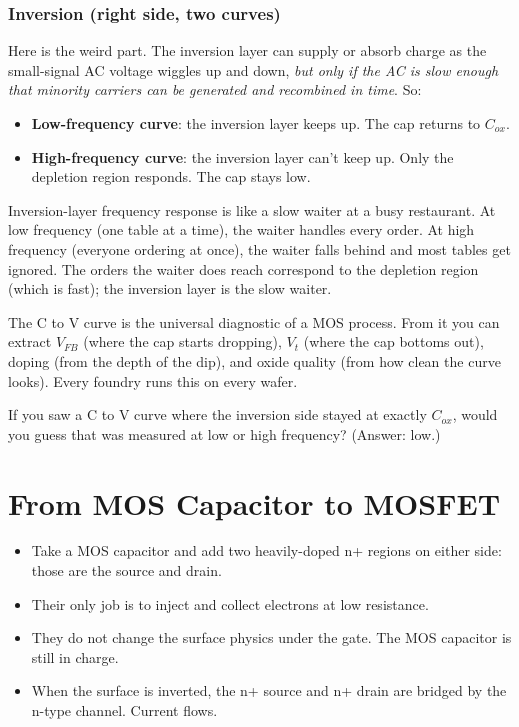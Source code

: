 \documentclass[11pt]{article}
\begin{document}
\subsubsection{Inversion (right side, two curves)}

Here is the weird part. The inversion layer can supply or absorb charge as the small-signal AC voltage wiggles up and down, \emph{but only if the AC is slow enough that minority carriers can be generated and recombined in time}. So:
\begin{itemize}
\item \textbf{Low-frequency curve}: the inversion layer keeps up. The cap returns to $C_{ox}$.
\item \textbf{High-frequency curve}: the inversion layer can't keep up. Only the depletion region responds. The cap stays low.
\end{itemize}

\begin{hook}
Inversion-layer frequency response is like a slow waiter at a busy restaurant. At low frequency (one table at a time), the waiter handles every order. At high frequency (everyone ordering at once), the waiter falls behind and most tables get ignored. The orders the waiter does reach correspond to the depletion region (which is fast); the inversion layer is the slow waiter.
\end{hook}

\begin{keyidea}
The C to V curve is the universal diagnostic of a MOS process. From it you can extract $V_{FB}$ (where the cap starts dropping), $V_t$ (where the cap bottoms out), doping (from the depth of the dip), and oxide quality (from how clean the curve looks). Every foundry runs this on every wafer.
\end{keyidea}

\begin{gut}
If you saw a C to V curve where the inversion side stayed at exactly $C_{ox}$, would you guess that was measured at low or high frequency? (Answer: low.)
\end{gut}

\section{From MOS Capacitor to MOSFET}

\begin{tldr}
\begin{itemize}[leftmargin=*]
\item Take a MOS capacitor and add two heavily-doped n+ regions on either side: those are the source and drain.
\item Their only job is to inject and collect electrons at low resistance.
\item They do not change the surface physics under the gate. The MOS capacitor is still in charge.
\item When the surface is inverted, the n+ source and n+ drain are bridged by the n-type channel. Current flows.
\end{itemize}
\end{tldr}
\end{document}
